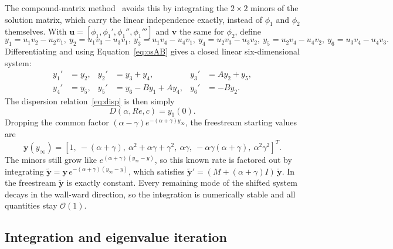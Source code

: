 \documentclass[12pt,a4paper]{article}
\begin{document}
The compound-matrix method~\cite{ng1979, drazin2004} avoids this by integrating the $2\times 2$ minors of the solution matrix, which carry the linear independence exactly, instead of $\phi_1$ and $\phi_2$ themselves. With $\mathbf{u} = [\phi_1, \phi_1', \phi_1'', \phi_1''']$ and $\mathbf{v}$ the same for $\phi_2$, define
\begin{equation}
    y_1 = u_1v_2 - u_2v_1,\ y_2 = u_1v_3 - u_3v_1,\ y_3 = u_1v_4 - u_4v_1,\
    y_4 = u_2v_3 - u_3v_2,\ y_5 = u_2v_4 - u_4v_2,\ y_6 = u_3v_4 - u_4v_3 .
\end{equation}
Differentiating and using Equation~\eqref{eq:osAB} gives a closed linear six-dimensional system:
\begin{equation}
\begin{aligned}
    y_1' &= y_2, & y_2' &= y_3 + y_4, & y_3' &= A y_2 + y_5, \\
    y_4' &= y_5, & y_5' &= y_6 - B y_1 + A y_4, & y_6' &= -B y_2 .
\end{aligned}
\label{eq:compound}
\end{equation}
The dispersion relation~\eqref{eq:disp} is then simply
\begin{equation}
    D(\alpha, Re, c) = y_1(0).
\end{equation}
Dropping the common factor $(\alpha - \gamma)e^{-(\alpha+\gamma)y_\infty}$, the freestream starting values are
\begin{equation}
    \mathbf{y}(y_\infty) = \left[1,\ -(\alpha+\gamma),\ \alpha^2 + \alpha\gamma + \gamma^2,\ \alpha\gamma,\ -\alpha\gamma(\alpha+\gamma),\ \alpha^2\gamma^2\right]^T .
\end{equation}
The minors still grow like $e^{(\alpha+\gamma)(y_\infty - y)}$, so this known rate is factored out by integrating $\tilde{\mathbf{y}} = \mathbf{y}\, e^{-(\alpha+\gamma)(y_\infty - y)}$, which satisfies $\tilde{\mathbf{y}}' = (M + (\alpha+\gamma)I)\,\tilde{\mathbf{y}}$. In the freestream $\tilde{\mathbf{y}}$ is exactly constant. Every remaining mode of the shifted system decays in the wall-ward direction, so the integration is numerically stable and all quantities stay $\mathcal{O}(1)$.

\subsection{Integration and eigenvalue iteration}
\end{document}
